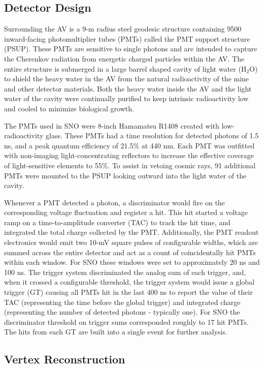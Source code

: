 \subsection{Detector Design}

Surrounding the AV is a 9-m radius steel geodesic structure containing 9500 inward-facing photomultiplier tubes (PMTs) called the PMT support structure (PSUP).
These PMTs are sensitive to single photons and are intended to capture the Cherenkov radiation from energetic charged particles within the AV.
The entire structure is submerged in a large barrel shaped cavity of light water (H$_2$O) to shield the heavy water in the AV from the natural radioactivity of the mine and other detector materials.
Both the heavy water inside the AV and the light water of the cavity were continually purified to keep intrinsic radioactivity low and cooled to minimize biological growth.

The PMTs used in SNO were 8-inch Hamamatsu R1408 created with low-radioactivity glass. 
These PMTs had a time resolution for detected photons of 1.5 ns, and a peak quantum efficiency of 21.5\% at 440 nm.
Each PMT was outfitted with non-imaging light-concentrating reflectors to increase the effective coverage of light-sensitive elements to 55\%.
To assist in vetoing cosmic rays, 91 additional PMTs were mounted to the PSUP looking outward into the light water of the cavity. 

Whenever a PMT detected a photon, a discriminator would fire on the corresponding voltage fluctuation and register a hit.
This hit started a voltage ramp on a time-to-amplitude converter (TAC) to track the hit time, and integrated the total charge collected by the PMT.
Additionally, the PMT readout electronics would emit two  10-mV square pulses of configurable widths, which are summed across the entire detector and act as a count of coincidentally hit PMTs within each window.
For SNO these windows were set to approximately 20 ns and 100 ns.
The trigger system discriminated the analog sum of each trigger, and, when it crossed a configurable threshold, the trigger system would issue a global trigger (GT) causing all PMTs hit in the last 400 ns to report the value of their TAC (representing the time before the global trigger) and integrated charge (representing the number of detected photons - typically one).
For SNO the discriminator threshold on trigger sums corresponded roughly to 17 hit PMTs.
The hits from each GT are built into a single event for further analysis.

\subsection{Vertex Reconstruction}

